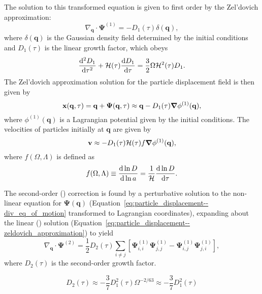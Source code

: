 The solution to this transformed equation is given to first order by the Zel'dovich approximation:
\begin{equation} \label{eq:particle_displacement--zeldovich_approximation}
	\nabla_{\mathbf{q}} \cdot \boldsymbol{\Psi}^{(1)} = -D_{1}(\tau) \delta(\mathbf{q}),
\end{equation}
where $\delta(\mathbf{q})$ is the Gaussian density field determined by the initial conditions and $D_{1}(\tau)$ is the linear growth factor, which obeys
\begin{equation}
	\frac{{\rm {d}}^{2} D_{1}}{{\rm {d}} \tau^{2}} + \mathcal{H}(\tau) \frac{{\rm {d}} D_{1}}{{\rm {d}} \tau} = \frac{3}{2} \Omega \mathcal{H}^{2}(\tau) D_{1}.
\end{equation}
The Zel'dovich approximation solution for the particle displacement field is then given by
\begin{equation}
	\mathbf{x}(\mathbf{q}, \tau) = \mathbf{q} + \boldsymbol{\Psi}(\mathbf{q}, \tau) \approx \mathbf{q} - D_{1}(\tau) {\boldsymbol{\nabla}} \phi^{(1)}(\mathbf{q}),
\end{equation}
where $\phi^{(1)}(\mathbf{q})$ is a Lagrangian potential given by the initial conditions.  The velocities of particles initially at $\mathbf{q}$ are given by
\begin{equation}
	\mathbf{v} \approx -D_{1}(\tau) \mathcal{H}(\tau) f {\boldsymbol{\nabla}} \phi^{(1)}(\mathbf{q}),
\end{equation}
where $f(\Omega, \Lambda)$ is defined as
\begin{equation}
	f(\Omega, \Lambda) \equiv \frac{{\rm {d}} \ln D}{{\rm {d}} \ln a} = \frac{1}{\mathcal{H}} \frac{{\rm {d}} \ln D}{{\rm {d}} \tau}.
\end{equation}

The second-order (\lpt) correction is found by a perturbative solution to the non-linear equation for $\boldsymbol{\Psi}(\mathbf{q})$ (Equation~\ref{eq:particle_displacement--div_eq_of_motion} transformed to Lagrangian coordinates), expanding about the linear (\za) solution (Equation~\ref{eq:particle_displacement--zeldovich_approximation}) to yield \citep[e.g. ][]{1995A&A...296..575B}
\begin{equation}
	\nabla_{\mathbf{q}} \cdot \boldsymbol{\Psi}^{(2)}
	= \frac{1}{2} D_{2}(\tau) \sum_{i \ne j} \left[ \boldsymbol{\Psi}_{i,i}^{(1)} \boldsymbol{\Psi}_{j,j}^{(1)}
	- \boldsymbol{\Psi}_{i,j}^{(1)} \boldsymbol{\Psi}_{j,i}^{(1)} \right],
\end{equation}
where $D_{2}(\tau)$ is the second-order growth factor.

\begin{equation}
	D_{2}(\tau) \approx -\frac{3}{7} D_{1}^{2}(\tau) \Omega^{-2/63} \approx -\frac{3}{7} D_{1}^{2}(\tau)
\end{equation}

